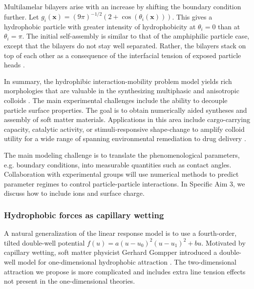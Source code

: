 Multilamelar bilayers arise with an increase by shifting the boundary condition
further. Let $g_i(\mathbf{x}) = (9\pi )^{-1/2}(2 + \cos(\theta_i(\mathbf{x})))$.
This gives a hydrophobic particle with greater intensity of hydrophobicity
at $\theta_i = 0$ than at $\theta_i = \pi$.  The initial self-assembly
is similar to that of the amphiphilic particle case, except that the bilayers
do not stay well separated.  Rather, the bilayers stack on top of each
other as a consequence of the interfacial tension of exposed particle heads \cite{deMeetal21}. 

In summary, the hydrophibic interaction-mobility problem model yields
rich morphologies that are valuable in the synthesizing multiphasic and
anisotropic colloids \cite{Bradley2016,Mallory2017,Bradley2017}.
The main experimental challenges include the ability to
decouple particle surface properties.
The goal is to obtain numerically aided 
syntheses and assembly of soft matter materials.
Applications in this area include cargo-carrying capacity, 
catalytic activity, or stimuli-responsive shape-change to amplify colloid
utility for a wide range of  spanning environmental remediation to drug
delivery \cite{McBr21, HaBr20}.







The main modeling challenge is to translate the phenomenological
parameters, e.g. boundary conditions, into measurable quantities
such as contact angles. Collaboration with experimental groups will
use numerical methods to predict parameter regimes 
to control particle-particle interactions. In Specific Aim 3, we
discuss how to include ions and surface charge. 

\subsubsection{Hydrophobic forces as capillary wetting}
A natural generalization of the linear response model is 
to use a fourth-order, tilted double-well potential
$f(u) = a(u-u_0)^2(u-u_1)^2 + bu$.
Motivated by capillary wetting, soft matter physicist Gerhard Gompper 
introduced a double-well model for one-dimensional hydrophobic attraction
\cite{GoHaKo94}. The two-dimensional attraction we propose
is more complicated and includes extra line tension effects
not present in the one-dimensional theories. 

